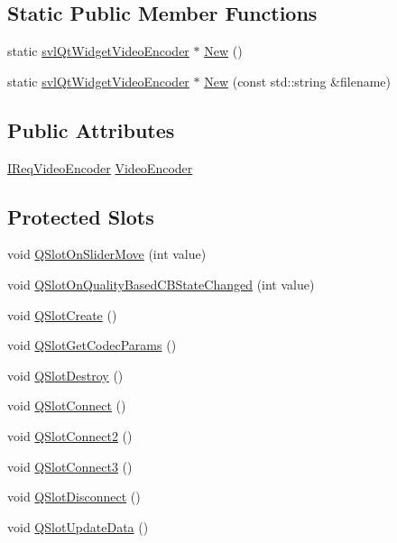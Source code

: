 \subsection*{Static Public Member Functions}
\begin{DoxyCompactItemize}
\item 
static \hyperlink{classsvl_qt_widget_video_encoder}{svl\-Qt\-Widget\-Video\-Encoder} $\ast$ \hyperlink{classsvl_qt_widget_video_encoder_a89b65a49e24d6e9c54bc42e5e974dd82}{New} ()
\item 
static \hyperlink{classsvl_qt_widget_video_encoder}{svl\-Qt\-Widget\-Video\-Encoder} $\ast$ \hyperlink{classsvl_qt_widget_video_encoder_a95cdd49b6285a77d7e1d3a455d43334a}{New} (const std\-::string \&filename)
\end{DoxyCompactItemize}
\subsection*{Public Attributes}
\begin{DoxyCompactItemize}
\item 
\hyperlink{class_i_req_video_encoder}{I\-Req\-Video\-Encoder} \hyperlink{classsvl_qt_widget_video_encoder_a2ed567dc99004fa316aae01879a44994}{Video\-Encoder}
\end{DoxyCompactItemize}
\subsection*{Protected Slots}
\begin{DoxyCompactItemize}
\item 
void \hyperlink{classsvl_qt_widget_video_encoder_ae6fba1aa0bec37fcb4577ad58363cd0f}{Q\-Slot\-On\-Slider\-Move} (int value)
\item 
void \hyperlink{classsvl_qt_widget_video_encoder_a0b746277e625c82d239da136a1cd706b}{Q\-Slot\-On\-Quality\-Based\-C\-B\-State\-Changed} (int value)
\item 
void \hyperlink{classsvl_qt_widget_video_encoder_a06f6819cdee34cfa57eb1f048840a682}{Q\-Slot\-Create} ()
\item 
void \hyperlink{classsvl_qt_widget_video_encoder_a114cf3ba66b08d4df48e7aae932285ea}{Q\-Slot\-Get\-Codec\-Params} ()
\item 
void \hyperlink{classsvl_qt_widget_video_encoder_a7cb9827b56df5d64655d3a1fe56fbd4b}{Q\-Slot\-Destroy} ()
\item 
void \hyperlink{classsvl_qt_widget_video_encoder_a75404727f85823e9e130d0effb0c88f6}{Q\-Slot\-Connect} ()
\item 
void \hyperlink{classsvl_qt_widget_video_encoder_a2c2386b45785b68c97b1940aa67a73f6}{Q\-Slot\-Connect2} ()
\item 
void \hyperlink{classsvl_qt_widget_video_encoder_a48e14f82f19daa37f297a67da381959e}{Q\-Slot\-Connect3} ()
\item 
void \hyperlink{classsvl_qt_widget_video_encoder_a235f1542b527528ffe9f875059e1ff9e}{Q\-Slot\-Disconnect} ()
\item 
void \hyperlink{classsvl_qt_widget_video_encoder_aa94093ca17a79c4907a6b244e33fa749}{Q\-Slot\-Update\-Data} ()
\end{DoxyCompactItemize}
